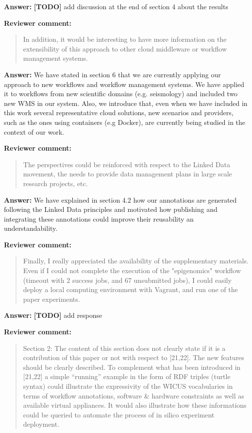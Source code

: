 \documentclass{letter}
\newenvironment{review}%
{\textbf{Reviewer comment:}\begin{quote}}%
{\end{quote}}%
\newcommand{\todo}[1]{%
      \color{red}\textbf{[TODO]} #1\color{black}}
\newcommand{\answer}[1]{%
      \textbf{Answer:} #1}
\begin{document}
\begin{letter}{}
\answer{\todo{add discussion at the end of section 4 about the results}}


\begin{review}
In addition, it would be interesting to have more information on the extensibility of this approach to other cloud middleware or workflow management systems.
\end{review}

\answer{We have stated in section 6 that we are currently applying our approach to new workflows and workflow management systems. We have applied it to workflows from new scientific domains (e.g. seismology) and included two new WMS in our system.} Also, we introduce that, even when we have included in this work several representative cloud solutions, new scenarios and providers, such as the ones using containers (e.g Docker), are currently being studied in the context of our work.



\begin{review}
The perspectives could be reinforced with respect to the Linked Data movement, the needs to provide data management plans in large scale research projects, etc.
\end{review}

\answer{We have explained in section 4.2 how our annotations are generated following the Linked Data principles and motivated how publishing and integrating these annotations could improve their reusability an understandability.}


\begin{review}
Finally, I really appreciated the availability of the supplementary materials. Even if I could not complete the execution of the "epigenomics" workflow (timeout with 2 success jobs, and 67 unsubmitted jobs), I could easily deploy a local computing environment with Vagrant, and run one of the paper experiments.
\end{review}

\answer{\todo{add response}}


\begin{review}
Section 2: The content of this section does not clearly state if it is a contribution of this paper or not with respect to [21,22]. The new features should be clearly described. To complement what has been introduced in [21,22] a simple ``running'' example in the form of RDF triples (turtle syntax) could illustrate the expressivity of the WICUS vocabularies in terms of workflow annotations, software \& hardware constraints as well as available virtual appliances. It would also illustrate how these informations could be queried to automate the process of in silico experiment deployment.
\end{review}


\end{letter}
\end{document}
